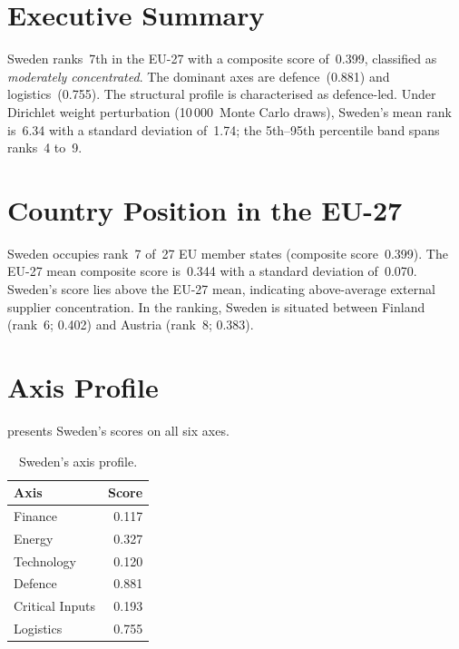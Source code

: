 \documentclass[12pt,a4paper]{article}
\begin{document}
\hypersetup{pageanchor=true}
\pagestyle{fancy}
\renewcommand{\headrulewidth}{0.4pt}


\section{Executive Summary}
\label{sec:summary}

Sweden ranks~7th in the EU-27 with a composite \ISI score of~0.399, classified as \emph{moderately concentrated}.  The dominant axes are defence~(0.881) and logistics~(0.755).  The structural profile is characterised as defence-led.  Under Dirichlet weight perturbation (10\,000~Monte Carlo draws), Sweden's mean rank is~6.34 with a standard deviation of~1.74; the 5th--95th percentile band spans ranks~4 to~9.


\section{Country Position in the EU-27}
\label{sec:position}

Sweden occupies rank~7 of~27 EU member states (composite score~0.399).  The EU-27 mean composite score is~0.344 with a standard deviation of~0.070.  Sweden's score lies above the EU-27 mean, indicating above-average external supplier concentration.  In the ranking, Sweden is situated between Finland (rank~6; 0.402) and Austria (rank~8; 0.383).


\section{Axis Profile}
\label{sec:axis-profile}

 presents Sweden's scores on all six \ISI axes.

\begin{table}[htbp]
\centering\small
\caption{Sweden's \ISI axis profile.}
\label{tab:axis-profile}
\begin{tabular}{@{}lr@{}}
\toprule
\textbf{Axis} & \textbf{Score} \\
\midrule
    Finance           & 0.117 \\
    Energy            & 0.327 \\
    Technology        & 0.120 \\
    Defence           & 0.881 \\
    Critical Inputs   & 0.193 \\
    Logistics         & 0.755 \\
\bottomrule
\end{tabular}
\end{table}
\end{document}
